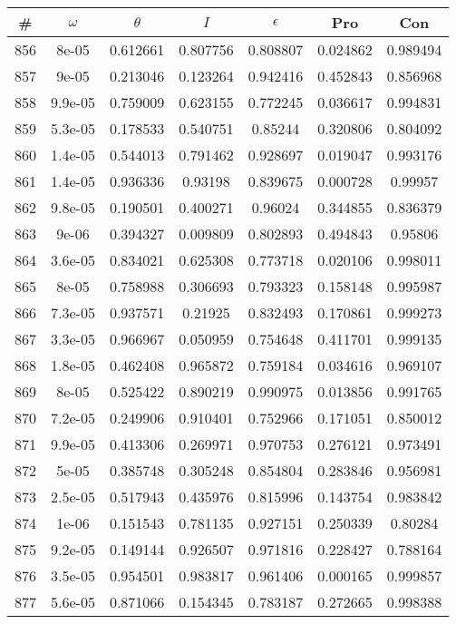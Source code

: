 \newpage
\begin{table}
\begin{tabular}{c|c|c|c|c|c|c}
\# & $\omega$ & $\theta$ & $I$ & $\epsilon$ & Pro & Con\\
\hline
856 & 8e-05 & 0.612661 & 0.807756 & 0.808807 & 0.024862 & 0.989494\\
857 & 9e-05 & 0.213046 & 0.123264 & 0.942416 & 0.452843 & 0.856968\\
858 & 9.9e-05 & 0.759009 & 0.623155 & 0.772245 & 0.036617 & 0.994831\\
859 & 5.3e-05 & 0.178533 & 0.540751 & 0.85244 & 0.320806 & 0.804092\\
860 & 1.4e-05 & 0.544013 & 0.791462 & 0.928697 & 0.019047 & 0.993176\\
861 & 1.4e-05 & 0.936336 & 0.93198 & 0.839675 & 0.000728 & 0.99957\\
862 & 9.8e-05 & 0.190501 & 0.400271 & 0.96024 & 0.344855 & 0.836379\\
863 & 9e-06 & 0.394327 & 0.009809 & 0.802893 & 0.494843 & 0.95806\\
864 & 3.6e-05 & 0.834021 & 0.625308 & 0.773718 & 0.020106 & 0.998011\\
865 & 8e-05 & 0.758988 & 0.306693 & 0.793323 & 0.158148 & 0.995987\\
866 & 7.3e-05 & 0.937571 & 0.21925 & 0.832493 & 0.170861 & 0.999273\\
867 & 3.3e-05 & 0.966967 & 0.050959 & 0.754648 & 0.411701 & 0.999135\\
868 & 1.8e-05 & 0.462408 & 0.965872 & 0.759184 & 0.034616 & 0.969107\\
869 & 8e-05 & 0.525422 & 0.890219 & 0.990975 & 0.013856 & 0.991765\\
870 & 7.2e-05 & 0.249906 & 0.910401 & 0.752966 & 0.171051 & 0.850012\\
871 & 9.9e-05 & 0.413306 & 0.269971 & 0.970753 & 0.276121 & 0.973491\\
872 & 5e-05 & 0.385748 & 0.305248 & 0.854804 & 0.283846 & 0.956981\\
873 & 2.5e-05 & 0.517943 & 0.435976 & 0.815996 & 0.143754 & 0.983842\\
874 & 1e-06 & 0.151543 & 0.781135 & 0.927151 & 0.250339 & 0.80284\\
875 & 9.2e-05 & 0.149144 & 0.926507 & 0.971816 & 0.228427 & 0.788164\\
876 & 3.5e-05 & 0.954501 & 0.983817 & 0.961406 & 0.000165 & 0.999857\\
877 & 5.6e-05 & 0.871066 & 0.154345 & 0.783187 & 0.272665 & 0.998388\\

\end{tabular}
\end{table}
